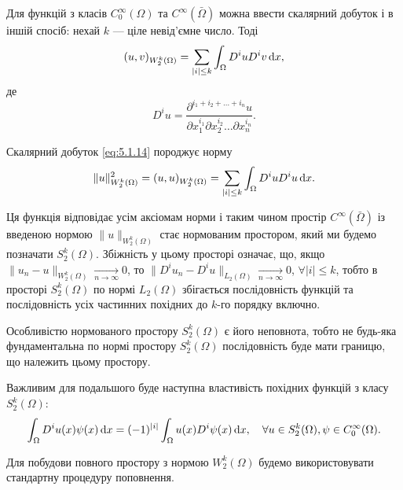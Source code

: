 \begin{proposition}
    Для функцій з класів $C_0^\infty(\Omega)$ та $C^\infty(\bar \Omega)$ можна ввести скалярний добуток і в іншій
    спосіб: нехай $k$ --- ціле невід'ємне число. Тоді
    \begin{equation}
        \label{eq:5.1.14}
        (u, v)_{W_2^k(\Omega)} = \sum_{|i| \le k} \int_\Omega D^i u D^i v \mathop{}\!\mathrm{d} x,
    \end{equation}
    де 
    \begin{equation}
        \label{eq:5.1.15}
        D^i u = \frac{\partial^{i_1 + i_2 + \ldots + i_n} u}{\partial x_1^{i_1} \partial x_2^{i_2} \ldots \partial x_n^{i_n}}.
    \end{equation}
\end{proposition}

\begin{proposition}
    Скалярний добуток \eqref{eq:5.1.14} породжує норму 
    \begin{equation}
        \label{eq:5.1.14'}
        \|u\|_{W_2^k(\Omega)}^2 = (u, u)_{W_2^k(\Omega)} = \sum_{|i| \le k} \int_\Omega D^i u D^i u \mathop{}\!\mathrm{d} x.
    \end{equation}
\end{proposition}

Ця функція відповідає усім аксіомам норми і таким чином простір $C^\infty(\bar \Omega)$ із введеною нормою $\|u\|_{W_2^k(\Omega)}$ стає нормованим простором, який ми будемо позначати $S_2^k(\Omega)$. Збіжність у цьому просторі означає, що, якщо $\|u_n -  u\|_{W_2^k(\Omega)} \xrightarrow[n \to \infty]{} 0$, то $\|D^i u_n - D^i u\|_{L_2(\Omega)} \xrightarrow[n \to \infty]{} 0$, $\forall |i| \le k$, тобто в просторі $S_2^k(\Omega)$ по нормі $L_2(\Omega)$ збігається послідовність функцій та послідовність усіх частинних похідних до $k$-го порядку включно. \medskip

Особливістю нормованого простору $S_2^k(\Omega)$ є його неповнота, тобто не будь-яка фундаментальна по нормі простору $S_2^k(\Omega)$ послідовність буде мати границю, що належить цьому простору. \medskip

Важливим для подальшого буде наступна властивість похідних функцій з класу $S_2^k(\Omega)$:
\begin{equation}
    \label{eq:5.1.16}
    \int_\Omega D^i u(x) \psi(x) \mathop{}\!\mathrm{d} x = (-1)^{|i|} \int_\Omega u(x) D^i \psi(x) \mathop{}\!\mathrm{d} x, \quad \forall u \in S_2^k(\Omega), \psi \in C_0^\infty(\Omega).
\end{equation} 

Для побудови повного простору з нормою $W_2^k(\Omega)$ будемо використовувати стандартну процедуру поповнення. \medskip

